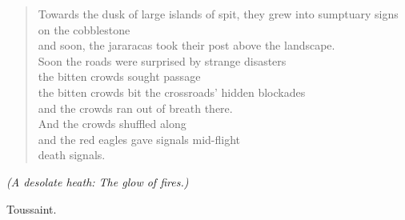 \documentclass[letterpaper,article,12pt,oneside,notitlepage]{memoir}
\begin{document}
\begin{verse}
Towards the dusk of large islands of spit, they grew into sumptuary signs on the cobblestone \\
and soon, the jararacas took their post above the landscape. \\
Soon the roads were surprised by strange disasters \\
the bitten crowds sought passage \\
the bitten crowds bit the crossroads' hidden blockades \\
and the crowds ran out of breath there. \\
And the crowds shuffled along \\
and the red eagles gave signals mid-flight \\
death signals. \\
\end{verse}

\textit{(A desolate heath: The glow of fires.)}

\begin{center}Toussaint.\end{center}
\end{document}

